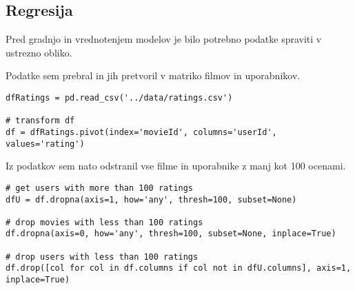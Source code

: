 \documentclass[a4paper,11pt]{article}
\begin{document}
%
%
%
%

\subsection{Regresija}
Pred gradnjo in vrednotenjem modelov je bilo potrebno podatke spraviti v
ustrezno obliko.

Podatke sem prebral in jih pretvoril v matriko filmov in uporabnikov.

\begin{lstlisting}
dfRatings = pd.read_csv('../data/ratings.csv')

# transform df
df = dfRatings.pivot(index='movieId', columns='userId', values='rating')
\end{lstlisting}

Iz podatkov sem nato odstranil vse filme in uporabnike z manj kot 100 ocenami.

\begin{lstlisting}
# get users with more than 100 ratings
dfU = df.dropna(axis=1, how='any', thresh=100, subset=None)

# drop movies with less than 100 ratings
df.dropna(axis=0, how='any', thresh=100, subset=None, inplace=True)

# drop users with less than 100 ratings
df.drop([col for col in df.columns if col not in dfU.columns], axis=1, inplace=True)

\end{lstlisting}
\end{document}

